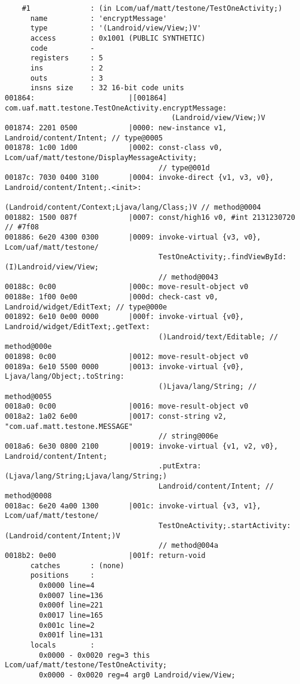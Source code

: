 \begin{lstlisting}
    #1              : (in Lcom/uaf/matt/testone/TestOneActivity;)
      name          : 'encryptMessage'
      type          : '(Landroid/view/View;)V'
      access        : 0x1001 (PUBLIC SYNTHETIC)
      code          -
      registers     : 5
      ins           : 2
      outs          : 3
      insns size    : 32 16-bit code units
001864:                      |[001864] com.uaf.matt.testone.TestOneActivity.encryptMessage:
                                       (Landroid/view/View;)V
001874: 2201 0500            |0000: new-instance v1, Landroid/content/Intent; // type@0005
001878: 1c00 1d00            |0002: const-class v0, Lcom/uaf/matt/testone/DisplayMessageActivity;
                                    // type@001d
00187c: 7030 0400 3100       |0004: invoke-direct {v1, v3, v0}, Landroid/content/Intent;.<init>:
                                    (Landroid/content/Context;Ljava/lang/Class;)V // method@0004
001882: 1500 087f            |0007: const/high16 v0, #int 2131230720 // #7f08
001886: 6e20 4300 0300       |0009: invoke-virtual {v3, v0}, Lcom/uaf/matt/testone/
                                    TestOneActivity;.findViewById:(I)Landroid/view/View;
                                    // method@0043
00188c: 0c00                 |000c: move-result-object v0
00188e: 1f00 0e00            |000d: check-cast v0, Landroid/widget/EditText; // type@000e
001892: 6e10 0e00 0000       |000f: invoke-virtual {v0}, Landroid/widget/EditText;.getText:
                                    ()Landroid/text/Editable; // method@000e
001898: 0c00                 |0012: move-result-object v0
00189a: 6e10 5500 0000       |0013: invoke-virtual {v0}, Ljava/lang/Object;.toString:
                                    ()Ljava/lang/String; // method@0055
0018a0: 0c00                 |0016: move-result-object v0
0018a2: 1a02 6e00            |0017: const-string v2, "com.uaf.matt.testone.MESSAGE"
                                    // string@006e
0018a6: 6e30 0800 2100       |0019: invoke-virtual {v1, v2, v0}, Landroid/content/Intent;
                                    .putExtra:(Ljava/lang/String;Ljava/lang/String;)
                                    Landroid/content/Intent; // method@0008
0018ac: 6e20 4a00 1300       |001c: invoke-virtual {v3, v1}, Lcom/uaf/matt/testone/
                                    TestOneActivity;.startActivity:(Landroid/content/Intent;)V
                                    // method@004a
0018b2: 0e00                 |001f: return-void
      catches       : (none)
      positions     :
        0x0000 line=4
        0x0007 line=136
        0x000f line=221
        0x0017 line=165
        0x001c line=2
        0x001f line=131
      locals        :
        0x0000 - 0x0020 reg=3 this Lcom/uaf/matt/testone/TestOneActivity;
        0x0000 - 0x0020 reg=4 arg0 Landroid/view/View;


\end{lstlisting}

